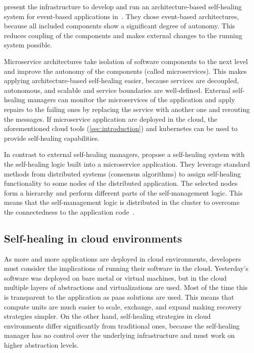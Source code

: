   \citeauthor{DashofyArchitecture} present the infrastructure to develop and run an architecture-based self-healing system for event-based applications in~\cite{DashofyArchitecture}.
  They chose event-based architectures, because all included components show a significant degree of autonomy.
  This reduces coupling of the components and makes external changes to the running system possible.

  Microservice architectures take isolation of software components to the next level and improve the autonomy of the components (called microservices).
  This makes applying architecture-based self-healing easier, because services are decoupled, autonomous, and scalable and service boundaries are well-defined.
  External self-healing managers can monitor the microservices of the application and apply repairs to the failing ones by replacing the service with another one and rerouting the messages.
  If microservice application are deployed in the cloud, the aforementioned cloud tools (\cref{sec:introduction}) and \gls{kubernetes} can be used to provide self-healing capabilities.

  In contrast to external self-healing managers, \citeauthor{ToffettiMicroservices} propose a self-healing system with the self-healing logic built into a microservice application.
  They leverage standard methods from distributed systems (\ie consensus algorithms) to assign self-healing functionality to some nodes of the distributed application.
  The selected nodes form a hierarchy and perform different parts of the self-management logic.
  This means that the self-management logic is distributed in the cluster to overcome the connectedness to the application code~\cite{ToffettiMicroservices}.

\subsection{Self-healing in cloud environments}\label{sec:self-healing:cloud}
  As more and more applications are deployed in cloud environments, developers must consider the implications of running their software in the cloud.
  Yesterday's software was deployed on bare metal or virtual machines, but in the cloud multiple layers of abstractions and virtualizations are used.
  Most of the time this is transparent to the application as \gls{paas} solutions are used.
  This means that compute units are much easier to scale, exchange, and expand making recovery strategies simpler.
  On the other hand, self-healing strategies in cloud environments differ significantly from traditional ones, because the self-healing manager has no control over the underlying infrastructure and must work on higher abstraction levels.

